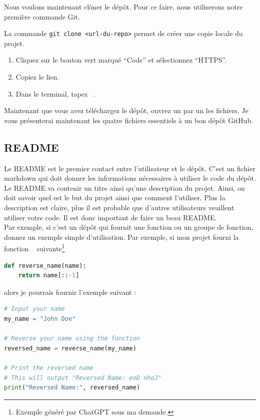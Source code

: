 \documentclass{book}
\newenvironment{myexampleblock}[1]{%
    \tcolorbox[beamer,%
    noparskip,breakable,
    colback=LightGreen,colframe=DarkGreen,%
    colbacklower=LimeGreen!75!LightGreen,%
    title={#1}, width=\textwidth]}%
    {\endtcolorbox}
\newenvironment{myblock}[1]{%
    \tcolorbox[beamer,%
    noparskip,breakable,
    colback=LightBlue,colframe=DarkBlue,%
    colbacklower=DarkBlue!75!LightBlue,%
    title={#1}, width=\textwidth]}%
    {\endtcolorbox}
\newcommand{\code}[1]{\mbox{%
    \ttfamily
    \tcbox[
        on line,
        boxsep=0pt, left=4pt, right=4pt, top=2pt, bottom=1.5pt,
        toprule=0pt, rightrule=0pt, bottomrule=0pt, leftrule=0pt,
        oversize=0pt, enlarge left by=0pt, enlarge right by=0pt,
        colframe=white, colback=black!12,
        height=.8\baselineskip %
    ]{#1}%
}}
\begin{document}
Nous voulons maintenant clôner le dépôt. Pour ce faire, nous utiliserons notre première commande Git.

\begin{myblock}{\href{https://git-scm.com/docs/git-clone}{git clone}}
    La commande \texttt{git clone <url-du-repo>} permet de créer une copie locale du projet. 
\end{myblock}

\begin{myexampleblock}{Exercice : Clôner le dépôt du tutoriel}
    \begin{enumerate}
        \item Cliquez sur le bouton vert marqué ``Code'' et sélectionnez ``HTTPS''.
        \item Copiez le lien.
        \item Dans le terminal, tapez \code{\texttt{git clone <lien-du-repo>}}.
    \end{enumerate}
\end{myexampleblock}

Maintenant que vous avez téléchargez le dépôt, ouvrez un par un les fichiers. Je vous présenterai maintenant les quatre fichiers essentiels à un bon dépôt GitHub.

\subsection{README}

Le README est le premier contact entre l'utilisateur et le dépôt. C'est un fichier markdown qui doit donner les informations nécessaires à utiliser le code du dépôt. Le README va contenir un titre ainsi qu'une description du projet. Ainsi, on doit savoir quel est le but du projet ainsi que comment l'utiliser. Plus la description est claire, plus il est probable que d'autres utilisateurs veuillent utiliser votre code. Il est donc important de faire un beau README. \\

Par exemple, si c'est un dépôt qui fournit une fonction ou un groupe de fonction, donnez un exemple simple d'utilisation. Par exemple, si mon projet fourni la fonction \code{\texttt{reverse\_name}} suivante\footnote{Exemple généré par ChatGPT sous ma demande.}

\begin{lstlisting}[language=Python]
def reverse_name(name):
    return name[::-1]
\end{lstlisting}

alors je pourrais fournir l'exemple suivant :
\begin{lstlisting}[language=Python, commentstyle=\small\ttfamily,]
# Input your name
my_name = "John Doe"

# Reverse your name using the function
reversed_name = reverse_name(my_name)

# Print the reversed name
# This will output "Reversed Name: eoD nhoJ"
print("Reversed Name:", reversed_name)
\end{lstlisting}
\end{document}

